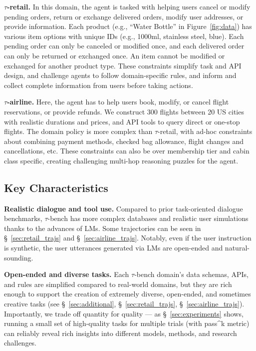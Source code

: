 \documentclass{article}
\newcommand{\benchmark}{$\tau$-bench}
\newcommand{\retail}{$\tau$-retail}  %
\newcommand{\airline}{$\tau$-airline}
\begin{document}
\textbf{\retail{}.} In this domain, the agent is tasked with helping users cancel or modify pending orders, return or exchange delivered orders, modify user addresses, or provide information. Each product (e.g., ``Water Bottle'' in Figure~\ref{fig:data}) has various item options with unique IDs (e.g., 1000ml, stainless steel, blue). Each pending order can only be canceled or modified once, and each delivered order can only be returned or exchanged once. An item cannot be modified or exchanged for another product type. These constraints simplify task and API design, and challenge agents to follow domain-specific rules, and inform and collect complete information from users before taking actions. 


\textbf{\airline{}.} Here, the agent has to help users book, modify, or cancel flight reservations, or provide refunds. We construct 300 flights between 20 US cities with realistic durations and prices, and API tools to query direct or one-stop flights. The domain policy is more complex than \retail{}, with ad-hoc constraints about combining payment methods, checked bag allowance, flight changes and cancellations, etc. These constraints can also be over membership tier and cabin class specific, creating challenging multi-hop reasoning puzzles for the agent.



\subsection{Key Characteristics}


\textbf{Realistic dialogue and tool use.} Compared to prior task-oriented dialogue benchmarks, \benchmark{} has more complex databases and realistic user simulations thanks to the advances of LMs. Some trajectories can be seen in \S~\ref{sec:retail_trajs} and \S~\ref{sec:airline_trajs}. Notably, even if the user instruction is synthetic, the user utterances generated via LMs are open-ended and natural-sounding. 

\textbf{Open-ended and diverse tasks.} Each \benchmark{} domain's data schemas, APIs, and rules are simplified compared to real-world domains, but they are rich enough to support the creation of extremely diverse, open-ended, and sometimes creative tasks (see \S~\ref{sec:additional}, \S~\ref{sec:retail_trajs}, \S~\ref{sec:airline_trajs}).
Importantly, we trade off quantity for quality --- as \S~\ref{sec:experiments} shows, running a small set of high-quality tasks for multiple trials (with pass\textasciicircum k metric) can reliably reveal rich insights into different models, methods, and research challenges.
\end{document}

